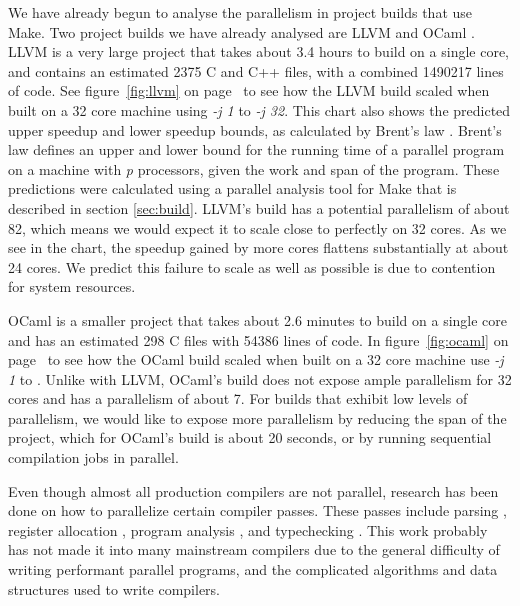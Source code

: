 \documentclass[10pt]{article}
\begin{document}
We have already begun to analyse the parallelism in project builds that use Make.  Two
project builds we have already analysed are LLVM \cite{llvm} and OCaml \cite{ocaml}.
LLVM is a very large project that takes about 3.4 hours to build on a
single core, and contains an estimated 2375 C and C++ files, with a combined 1490217 lines of code.
See figure~\ref{fig:llvm} on page~\pageref{fig:llvm} to see how the LLVM build scaled
when built on a 32 core machine using \emph{-j 1} to \emph{-j 32}.
This chart also shows the predicted upper speedup and lower speedup bounds, as
calculated by Brent's law \cite{brent1974parallel}.  Brent's law defines an upper and lower bound for
the running time of a parallel program on a machine with \emph{p} processors, given the work and span of
the program.  These predictions were calculated using a
parallel analysis tool for Make that is described in section \ref{sec:build}.  LLVM's build has
a potential parallelism of about 82, which means we would expect it to scale close to perfectly on 32 cores.
As we see in the chart, the speedup gained by more cores flattens substantially at about 24 cores.
We predict this failure to scale as well as possible is due to contention for system resources.


OCaml is a smaller project that takes about 2.6 minutes to build on a single core and has an estimated 298 C files with 54386 lines of code.
In figure~\ref{fig:ocaml} on page~\pageref{fig:ocaml} to see how the OCaml build scaled
when built on a 32 core machine use \emph{-j 1} to .  Unlike with LLVM, OCaml's build does not expose ample parallelism for 32 cores and
has a parallelism of about 7.  For builds that exhibit low levels of parallelism, we would like to
expose more parallelism by reducing the span of the project, which for OCaml's build is about 20 seconds,
or by running sequential compilation jobs in parallel.


Even though almost all production compilers are not parallel, research
has been done on how to parallelize certain compiler passes.  These passes include
parsing \cite{barenghi2015parallel}, register allocation \cite{makowski1995achieving} \cite{zobel1993program}, program analysis \cite{kuper2014freeze}
\cite{mendez2010parallel} \cite{prabhu2011eigencfa} \cite{zobel1992program}, and typechecking \cite{newton2016parallel}.
This work probably has not made it into many mainstream compilers due to the general difficulty of writing
performant parallel programs, and the complicated algorithms and data structures used to write compilers.
\end{document}

